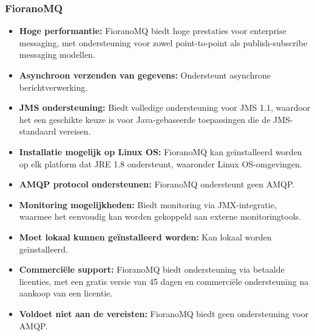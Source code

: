 \subsubsection{FioranoMQ}
\begin{itemize}
    \item \textbf{Hoge performantie:} FioranoMQ biedt hoge prestaties voor enterprise messaging, met ondersteuning voor zowel point-to-point als publish-subscribe messaging modellen.
    \item \textbf{Asynchroon verzenden van gegevens:} Ondersteunt asynchrone berichtverwerking.
    \item \textbf{JMS ondersteuning:} Biedt volledige ondersteuning voor JMS 1.1, waardoor het een geschikte keuze is voor Java-gebaseerde toepassingen die de JMS-standaard vereisen.
    \item \textbf{Installatie mogelijk op Linux OS:} FioranoMQ kan geïnstalleerd worden op elk platform dat JRE 1.8 ondersteunt, waaronder Linux OS-omgevingen.
    \item \textbf{AMQP protocol ondersteunen:} FioranoMQ ondersteunt geen AMQP.
    \item \textbf{Monitoring mogelijkheden:} Biedt monitoring via JMX-integratie, waarmee het eenvoudig kan worden gekoppeld aan externe monitoringtools.
    \item \textbf{Moet lokaal kunnen geïnstalleerd worden:} Kan lokaal worden geïnstalleerd.
    \item \textbf{Commerciële support:} FioranoMQ biedt ondersteuning via betaalde licenties, met een gratis versie van 45 dagen en commerciële ondersteuning na aankoop van een licentie.
    \item \textbf{Voldoet niet aan de vereisten: }
    FioranoMQ biedt geen ondersteuning voor AMQP.
    
\end{itemize}


